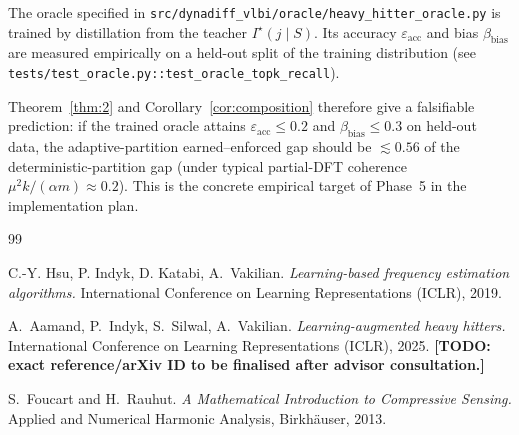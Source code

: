 \documentclass[11pt]{article}
\newcommand{\todomark}[1]{\textbf{[TODO: #1]}}
\theoremstyle{remark}
\begin{document}
The oracle specified in
\texttt{src/dynadiff\_vlbi/oracle/heavy\_hitter\_oracle.py} is trained by
distillation from the teacher
$I^\star(j\mid S)$. Its accuracy $\varepsilon_{\mathrm{acc}}$ and bias
$\beta_{\mathrm{bias}}$ are measured empirically on a held-out split of
the training distribution (see
\texttt{tests/test\_oracle.py::test\_oracle\_topk\_recall}).

Theorem~\ref{thm:2} and Corollary~\ref{cor:composition} therefore give a
falsifiable prediction: if the trained oracle attains
$\varepsilon_{\mathrm{acc}} \leq 0.2$ and
$\beta_{\mathrm{bias}} \leq 0.3$ on held-out data, the adaptive-partition
earned--enforced gap should be $\lesssim 0.56$ of the deterministic-partition
gap (under typical partial-DFT coherence $\mu^2 k / (\alpha m) \approx 0.2$).
This is the concrete empirical target of Phase~5 in the implementation
plan.

\begin{thebibliography}{99}

 C.-Y. Hsu, P. Indyk, D. Katabi, A.~Vakilian.
\emph{Learning-based frequency estimation algorithms.}
International Conference on Learning Representations (ICLR), 2019.

 A.~Aamand, P.~Indyk, S.~Silwal, A.~Vakilian.
\emph{Learning-augmented heavy hitters.}
International Conference on Learning Representations (ICLR), 2025.
\todomark{exact reference/arXiv ID to be finalised after advisor consultation.}

 S.~Foucart and H.~Rauhut.
\emph{A Mathematical Introduction to Compressive Sensing.}
Applied and Numerical Harmonic Analysis, Birkh\"auser, 2013.

\end{thebibliography}
\end{document}
